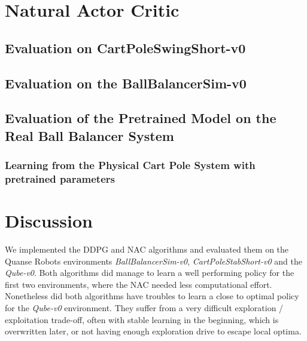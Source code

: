 \section{Natural Actor Critic}
\label{sec:nac}
\subsection{Evaluation on CartPoleSwingShort-v0}
\subsection{Evaluation on the BallBalancerSim-v0}
\subsection{Evaluation of the Pretrained Model on the Real Ball Balancer System}
\subsubsection{Learning from the Physical Cart Pole System with pretrained parameters}

\section{Discussion}
We implemented the DDPG and NAC algorithms and evaluated them on the Quanse Robots environments \textit{BallBalancerSim-v0}, \textit{CartPoleStabShort-v0} and the \textit{Qube-v0}. Both algorithms did manage to learn a well performing policy for the first two environments, where the NAC needed less computational effort. Nonetheless did both algorithms have troubles to learn a close to optimal policy for the \textit{Qube-v0} environment. They suffer from a very difficult exploration / exploitation trade-off, often with stable learning in the beginning, which is overwritten later, or not having enough exploration drive to escape local optima.
\label{sec:conclusion}






